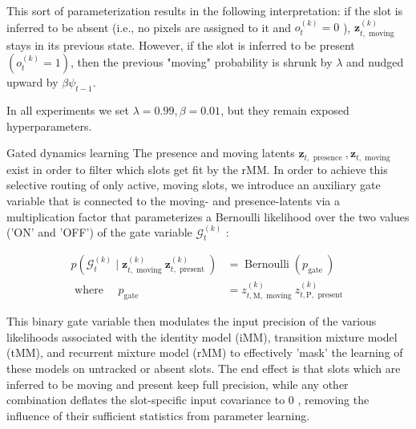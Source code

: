 \documentclass[10pt]{article}
\begin{document}
This sort of parameterization results in the following interpretation: if the slot is inferred to be absent (i.e., no pixels are assigned to it and $o_{t}^{(k)}=0$ ), $\mathbf{z}_{t, \text { moving }}^{(k)}$ stays in its previous state. However, if the slot is inferred to be present $\left(o_{t}^{(k)}=1\right)$, then the previous "moving" probability is shrunk by $\lambda$ and nudged upward by $\beta \psi_{t-1}$.

In all experiments we set $\lambda=0.99, \beta=0.01$, but they remain exposed hyperparameters.

Gated dynamics learning The presence and moving latents $\mathbf{z}_{t, \text { presence }}, \mathbf{z}_{t, \text { moving }}$ exist in order to filter which slots get fit by the rMM. In order to achieve this selective routing of only active, moving slots, we introduce an auxiliary gate variable that is connected to the moving- and presence-latents via a multiplication factor that parameterizes a Bernoulli likelihood over the two values ('ON' and 'OFF') of the gate variable $\mathcal{G}_{t}^{(k)}$ :


\begin{align*}
p\left(\mathcal{G}_{t}^{(k)} \mid \mathbf{z}_{t, \text { moving }}^{(k)} \mathbf{z}_{t, \text { present }}^{(k)}\right) & =\operatorname{Bernoulli}\left(p_{\text {gate }}\right)  \tag{21}\\
\text { where } \quad p_{\text {gate }} & =z_{t, \mathrm{M}, \text { moving }}^{(k)} z_{t, \mathrm{P}, \text { present }}^{(k)}
\end{align*}


This binary gate variable then modulates the input precision of the various likelihoods associated with the identity model (iMM), transition mixture model (tMM), and recurrent mixture model (rMM) to effectively 'mask' the learning of these models on untracked or absent slots. The end effect is that slots which are inferred to be moving and present keep full precision, while any other combination deflates the slot-specific input covariance to 0 , removing the influence of their sufficient statistics from parameter learning.
\end{document}
